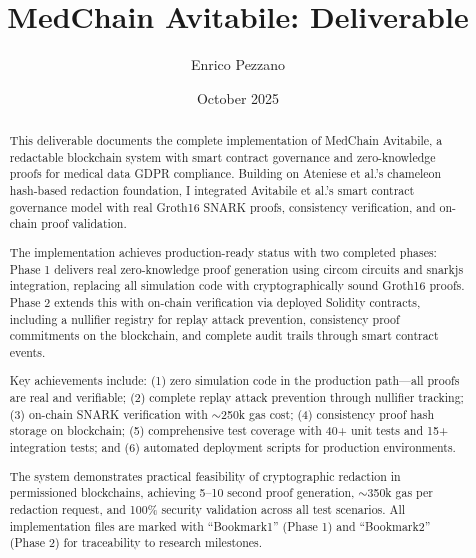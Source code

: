 \documentclass[11pt,a4paper]{article}
\title{MedChain Avitabile: Deliverable}
\author{Enrico Pezzano}
\date{October 2025}
\begin{document}
\maketitle

\begin{abstract}
This deliverable documents the complete implementation of MedChain Avitabile, a redactable blockchain system with smart contract governance and zero-knowledge proofs for medical data GDPR compliance. Building on Ateniese et al.'s chameleon hash-based redaction foundation, I integrated Avitabile et al.'s smart contract governance model with real Groth16 SNARK proofs, consistency verification, and on-chain proof validation.

The implementation achieves production-ready status with two completed phases: Phase 1 delivers real zero-knowledge proof generation using circom circuits and snarkjs integration, replacing all simulation code with cryptographically sound Groth16 proofs. Phase 2 extends this with on-chain verification via deployed Solidity contracts, including a nullifier registry for replay attack prevention, consistency proof commitments on the blockchain, and complete audit trails through smart contract events.

Key achievements include: (1) zero simulation code in the production path---all proofs are real and verifiable; (2) complete replay attack prevention through nullifier tracking; (3) on-chain SNARK verification with $\sim$250k gas cost; (4) consistency proof hash storage on blockchain; (5) comprehensive test coverage with 40+ unit tests and 15+ integration tests; and (6) automated deployment scripts for production environments.

The system demonstrates practical feasibility of cryptographic redaction in permissioned blockchains, achieving 5--10 second proof generation, $\sim$350k gas per redaction request, and 100\% security validation across all test scenarios. All implementation files are marked with ``Bookmark1'' (Phase 1) and ``Bookmark2'' (Phase 2) for traceability to research milestones.
\end{abstract}

\tableofcontents
\newpage









\nocite{botta2022towards,ateniese2017redactable,avitabile2024data}



\end{document}
